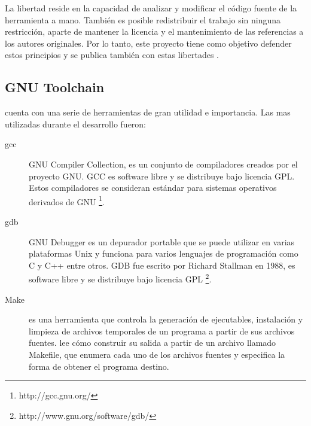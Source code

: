 La libertad reside en la capacidad de analizar y modificar el código fuente de la herramienta a mano. También es posible redistribuir el
trabajo sin ninguna restricción, aparte de mantener la licencia y el mantenimiento de las referencias a los autores originales. Por lo
tanto, este proyecto tiene como objetivo defender estos principios y se publica también con estas libertades .

\subsection{GNU Toolchain}
\linux{} cuenta con una serie de herramientas de gran utilidad e importancia. Las mas utilizadas durante el desarrollo fueron:
\begin{description}
  \item[gcc] GNU Compiler Collection, es un conjunto de compiladores creados por el proyecto GNU. GCC es software libre y se
distribuye bajo licencia GPL. Estos compiladores se consideran est\'andar para sistemas operativos derivados de GNU 
\footnote{http://gcc.gnu.org/}.

  \item[gdb] GNU Debugger es un depurador portable que se puede utilizar en varias plataformas Unix y funciona para varios
lenguajes de programaci\'on como C y C++ entre otros. GDB fue escrito por Richard Stallman en 1988, es software libre y se distribuye bajo
licencia GPL \footnote{http://www.gnu.org/software/gdb/}.

    \item[Make] es una herramienta que controla la generación de ejecutables, instalación y limpieza de archivos temporales de un
programa a partir de sus archivos fuentes. \make{} lee cómo construir su salida a partir de un archivo llamado Makefile, que enumera cada
uno de los archivos fuentes y especifica la forma de obtener el programa destino.   
\end{description}

